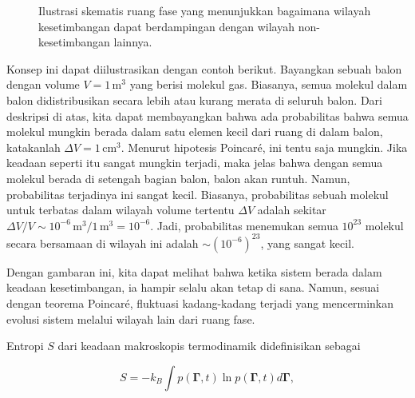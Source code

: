 \documentclass[a4paper,12pt]{book}
\begin{document}

\begin{figure}[h]
\centering
\caption{Ilustrasi skematis ruang fase yang menunjukkan bagaimana wilayah kesetimbangan dapat berdampingan dengan wilayah non-kesetimbangan lainnya.}
\label{fig:phase_space}
\end{figure}

Konsep ini dapat diilustrasikan dengan contoh berikut. Bayangkan sebuah balon dengan volume $V = 1 \, \text{m}^3$ yang berisi molekul gas. Biasanya, semua molekul dalam balon didistribusikan secara lebih atau kurang merata di seluruh balon. Dari deskripsi di atas, kita dapat membayangkan bahwa ada probabilitas bahwa semua molekul mungkin berada dalam satu elemen kecil dari ruang di dalam balon, katakanlah $\Delta V = 1 \, \text{cm}^3$. Menurut hipotesis Poincaré, ini tentu saja mungkin. Jika keadaan seperti itu sangat mungkin terjadi, maka jelas bahwa dengan semua molekul berada di setengah bagian balon, balon akan runtuh. Namun, probabilitas terjadinya ini sangat kecil. Biasanya, probabilitas sebuah molekul untuk terbatas dalam wilayah volume tertentu $\Delta V$ adalah sekitar $\Delta V / V \sim 10^{-6} \, \text{m}^3 / 1 \, \text{m}^3 = 10^{-6}$. Jadi, probabilitas menemukan semua $10^{23}$ molekul secara bersamaan di wilayah ini adalah $\sim (10^{-6})^{23}$, yang sangat kecil.

Dengan gambaran ini, kita dapat melihat bahwa ketika sistem berada dalam keadaan kesetimbangan, ia hampir selalu akan tetap di sana. Namun, sesuai dengan teorema Poincaré, fluktuasi kadang-kadang terjadi yang mencerminkan evolusi sistem melalui wilayah lain dari ruang fase.

Entropi $S$ dari keadaan makroskopis termodinamik didefinisikan sebagai

\begin{equation}
S = -k_B \int p(\mathbf{\Gamma}, t) \ln p(\mathbf{\Gamma}, t) d\mathbf{\Gamma},
\label{eq:entropy}
\end{equation}
\end{document}
